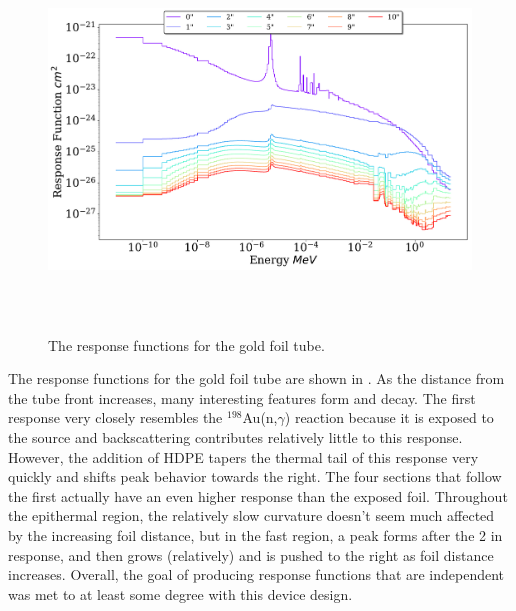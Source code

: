\begin{figure}[htb]
\centering
\includegraphics[height=4in]{tex/figures/ft_au.pdf}
\caption[Gold Foil Tube Response Functions]{The response functions for the gold foil tube.}
\label{fig:ft_au_rfs}
\end{figure}

The response functions for the gold foil tube are shown in .
As the distance from the tube front increases, many interesting features form and decay.
The first response very closely resembles the $^{198}$Au(n,$\gamma$) reaction because it is exposed to the source and backscattering contributes relatively little to this response.
However, the addition of HDPE tapers the thermal tail of this response very quickly and shifts peak behavior towards the right.
The four sections that follow the first actually have an even higher response than the exposed foil.
Throughout the epithermal region, the relatively slow curvature doesn't seem much affected by the increasing foil distance, but in the fast region, a peak forms after the 2 in response, and then grows (relatively) and is pushed to the right as foil distance increases.
Overall, the goal of producing response functions that are independent was met to at least some degree with this device design.

